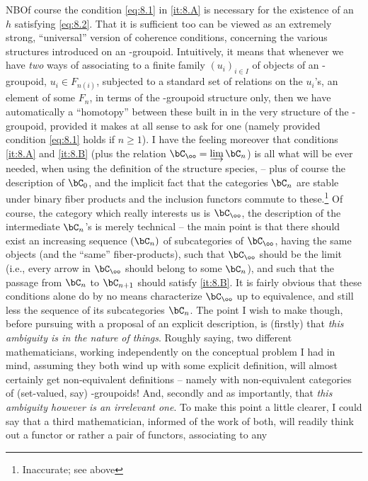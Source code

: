 NB\enspace Of course the condition \eqref{eq:8.1} in \ref{it:8.A} is necessary for the
existence of an $h$ satisfying \eqref{eq:8.2}. That it is sufficient
too can be viewed as an extremely strong, ``universal'' version of
coherence conditions, concerning the various structures introduced on
an \oo-groupoid. Intuitively, it means that whenever we have \emph{two} ways
of associating to a finite family $(u_i)_{i\in I}$ of objects of an
\oo-groupoid, $u_i\in F_{n(i)}$, subjected to a standard set of
relations on the $u_i$'s, an element of some $F_n$, in terms of the
\oo-groupoid structure only, then we have automatically a ``homotopy''
between these built in in the very structure of the \oo-groupoid,
provided it makes at all sense to ask for one (namely provided
condition \eqref{eq:8.1} holds if $n \ge 1$). I have the feeling
moreover that conditions \ref{it:8.A} and \ref{it:8.B} (plus the
relation $\bC_\oo = \varinjlim \bC_n$) is all what will be ever
needed, when using the definition of the structure species, -- plus of
course the description of $\bC_0$, and the implicit fact that the
categories $\bC_n$ are stable under binary fiber products and the
inclusion functors commute to these.\footnote{Inaccurate; see above}
Of course, the category which really interests us is $\bC_\oo$, the
description of the intermediate $\bC_n$'s is merely technical --
the main point is that there should exist an increasing sequence
$(\bC_n)$ of subcategories of $\bC_\oo$, having the same objects (and
the ``same'' fiber-products), such that $\bC_\oo$ should be the
limit (i.e., every arrow in $\bC_\oo$ should belong to some $\bC_n$),
and such that the passage from $\bC_n$ to $\bC_{n+1}$
should satisfy \ref{it:8.B}. It is fairly obvious that these
conditions alone do by no means characterize $\bC_\oo$ up to
equivalence, and still less the sequence of its subcategories $\bC_n$.
The point I wish to make though, before pursuing with a proposal
of an explicit description, is (firstly) that \emph{this ambiguity is in the nature of things}. Roughly saying, two different mathematicians,
working independently on the conceptual problem I had in mind, assuming
they both wind up with some explicit definition, will almost certainly
get non-equivalent definitions -- namely with non-equivalent
categories of (set-valued, say) \oo-groupoids! And, secondly and as
importantly, that \emph{this ambiguity however is an
  irrelevant one}. To make this point a little clearer, I could say
that a third mathematician, informed of the work of both, will readily
think out a functor or rather a pair of functors, associating to any
